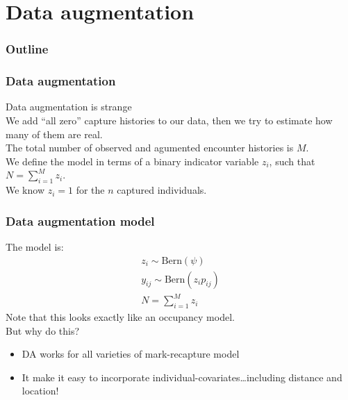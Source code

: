 \documentclass[color=usenames,dvipsnames]{beamer}\usepackage[]{graphicx}\usepackage[]{color}
\begin{document}
\section{Data augmentation}




\begin{frame}
  \frametitle{Outline}
  \Large
  \tableofcontents[currentsection]
\end{frame}



\begin{frame}
  \frametitle{Data augmentation}
  Data augmentation is strange \\
  \pause
  \vfill
  We add ``all zero'' capture histories to our data, then we try to
  estimate how many of them are real. \\ 
  \pause
  \vfill
  The total number of observed and agumented encounter histories is
  $M$. \\
  \pause
  \vfill
  We define the model in terms of a binary indicator variable $z_i$,
  such that $N=\sum_{i=1}^M z_i$. \\
  \pause
  \vfill
  We know $z_i=1$ for the $n$ captured individuals. \\
\end{frame}




\begin{frame}
  \frametitle{Data augmentation model}
  The model is:
  \begin{gather*}
    z_i \sim \mathrm{Bern}(\psi) \\
    y_{ij} \sim \mathrm{Bern}(z_i p_{ij}) \\
    N=\sum_{i=1}^M z_i
  \end{gather*}
  \pause \vfill
  Note that this looks exactly like an occupancy model. \\
  \pause \vfill
  But why do this?
  \begin{itemize}
    \item DA works for \alert{all} varieties of mark-recapture model
    \item It make it easy to incorporate
      individual-covariates\dots\pause including distance and
      location!   
  \end{itemize}
\end{frame}
\end{document}
